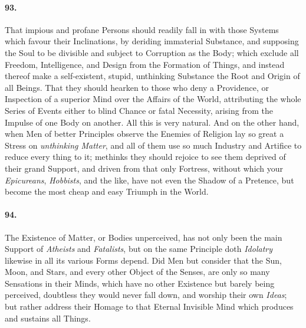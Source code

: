 \documentclass[]{article}
\newenvironment{sectionbody}{\begin{multicols}{2}}{\end{multicols}}
\begin{document}
\begin{sectionbody}
\paragraph{93.} That impious and profane Persons should readily fall in with
those Systems which favour their Inclinations, by deriding
immaterial Substance, and supposing the Soul to be divisible and
subject to Corruption as the Body; which exclude all Freedom,
Intelligence, and Design from the Formation of Things, and
instead thereof make a self-existent, stupid, unthinking
Substance the Root and Origin of all Beings.  That they should
hearken to those who deny a Providence, or Inspection of a
superior Mind over the Affairs of the World, attributing the
whole Series of Events either to blind Chance or fatal Necessity,
arising from the Impulse of one Body on another.  All this is
very natural.  And on the other hand, when Men of better
Principles observe the Enemies of Religion lay so great a Stress
on \emph{unthinking Matter}, and all of them use so much
Industry and Artifice to reduce every thing to it; methinks they
should rejoice to see them deprived of their grand Support, and
driven from that only Fortress, without which your
\emph{Epicureans}, \emph{Hobbists}, and the like, have not
even the Shadow of a Pretence, but become the most cheap and easy
Triumph in the World.



\paragraph{94.} The Existence of Matter, or Bodies unperceived, has not only been
the main Support of \emph{Atheists} and \emph{Fatalists}, but
on the same Principle doth \emph{Idolatry} likewise in all its
various Forms depend.  Did Men but consider that the Sun, Moon,
and Stars, and every other Object of the Senses, are only so many
Sensations in their Minds, which have no other Existence but
barely being perceived, doubtless they would never fall down, and
worship their own \emph{Ideas}; but rather address their Homage
to that {\sc Eternal Invisible Mind} which produces and sustains
all Things.




\end{sectionbody}
\end{document}
